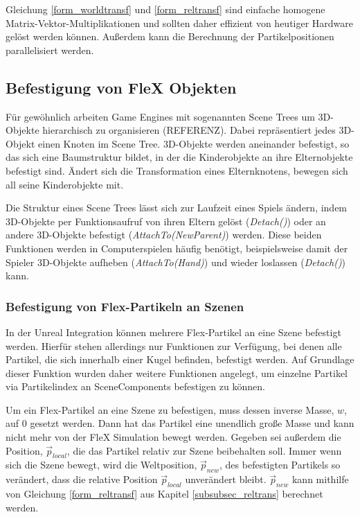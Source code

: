 Gleichung \ref{form_worldtransf} und \ref{form_reltransf} sind einfache homogene Matrix-Vektor-Multiplikationen und sollten daher effizient von heutiger Hardware gelöst werden können. Außerdem kann die Berechnung der Partikelpositionen parallelisiert werden.

\subsection{Befestigung von FleX Objekten}
\label{subsec_attach}




Für gewöhnlich arbeiten Game Engines mit sogenannten Scene Trees um 3D-Objekte hierarchisch zu organisieren (REFERENZ). Dabei repräsentiert jedes 3D-Objekt einen Knoten im Scene Tree. 3D-Objekte werden aneinander befestigt, so das sich eine Baumstruktur bildet, in der die Kinderobjekte an ihre Elternobjekte befestigt sind. Ändert sich die Transformation eines Elternknotens, bewegen sich all seine Kinderobjekte mit. 


Die Struktur eines Scene Trees lässt sich zur Laufzeit eines Spiels ändern, indem 3D-Objekte per Funktionsaufruf von ihren Eltern gelöst (\textit{Detach()}) oder an andere 3D-Objekte befestigt (\textit{AttachTo(NewParent)}) werden. Diese beiden Funktionen werden in Computerspielen häufig benötigt, beispielsweise damit der Spieler 3D-Objekte aufheben (\textit{AttachTo(Hand)}) und wieder loslassen (\textit{Detach()}) kann.

\subsubsection{Befestigung von Flex-Partikeln an Szenen}

In der Unreal Integration können mehrere Flex-Partikel an eine Szene befestigt werden. Hierfür stehen allerdings nur Funktionen zur Verfügung, bei denen alle Partikel, die sich innerhalb einer Kugel befinden, befestigt werden. Auf Grundlage dieser Funktion wurden daher weitere Funktionen angelegt, um einzelne Partikel via Partikelindex an SceneComponents befestigen zu können.

Um ein Flex-Partikel an eine Szene zu befestigen, muss dessen inverse Masse, $w$, auf 0 gesetzt werden. Dann hat das Partikel eine unendlich große Masse und kann nicht mehr von der FleX Simulation bewegt werden. 
Gegeben sei außerdem die Position, $\vec{p}_{local}$, die das Partikel relativ zur Szene beibehalten soll. Immer wenn sich die Szene bewegt, wird die Weltposition, $\vec{p}_{new}$, des befestigten Partikels so verändert, dass die relative Position $\vec{p}_{local}$ unverändert bleibt.
$\vec{p}_{new}$ kann mithilfe von Gleichung \ref{form_reltransf} aus Kapitel \ref{subsubsec_reltrans} berechnet werden.

